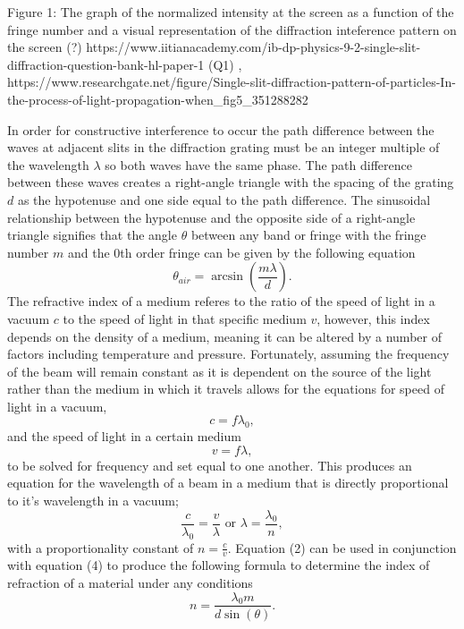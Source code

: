 \documentclass[11pt]{article}
\begin{document}
    Figure 1: The graph of the normalized intensity at the screen as a
function of the fringe number and a visual representation of the
diffraction inteference pattern on the screen (?)
https://www.iitianacademy.com/ib-dp-physics-9-2-single-slit-diffraction-question-bank-hl-paper-1
(Q1) ,
https://www.researchgate.net/figure/Single-slit-diffraction-pattern-of-particles-In-the-process-of-light-propagation-when\_fig5\_351288282

    In order for constructive interference to occur the path difference
between the waves at adjacent slits in the diffraction grating must be
an integer multiple of the wavelength \(\lambda\) so both waves have the
same phase. The path difference between these waves creates a
right-angle triangle with the spacing of the grating \(d\) as the
hypotenuse and one side equal to the path difference. The sinusoidal
relationship between the hypotenuse and the opposite side of a
right-angle triangle signifies that the angle \(\theta\) between any
band or fringe with the fringe number \(m\) and the 0th order fringe can
be given by the following equation
\[\theta_{air} = \arcsin (\frac{m \lambda}{d}).\tag{1}\] The refractive
index of a medium referes to the ratio of the speed of light in a vacuum
\(c\) to the speed of light in that specific medium \(v\), however, this
index depends on the density of a medium, meaning it can be altered by a
number of factors including temperature and pressure. Fortunately,
assuming the frequency of the beam will remain constant as it is
dependent on the source of the light rather than the medium in which it
travels allows for the equations for speed of light in a vacuum,
\[ c = f \lambda_0, \tag{2}\] and the speed of light in a certain medium
\[ v = f \lambda, \tag{3}\] to be solved for frequency and set equal to
one another. This produces an equation for the wavelength of a beam in a
medium that is directly proportional to it's wavelength in a vacuum;
\[ \frac{c}{\lambda_0} = \frac{v}{\lambda} \text{    or    } \lambda = \frac{\lambda_0}{n}, \tag{4}\]
with a proportionality constant of \(n = \frac{c}{v}\). Equation (2) can
be used in conjunction with equation (4) to produce the following
formula to determine the index of refraction of a material under any
conditions \[n = \frac{\lambda_0 m}{d \sin(\theta)}. \tag{5}\]
\end{document}
